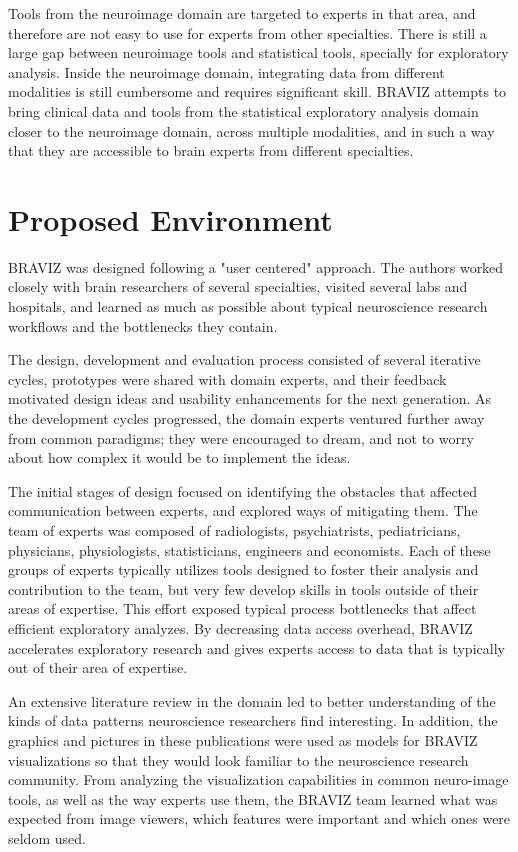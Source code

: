 \documentclass[utf8,paper]{frontiersSCNS} %
\begin{document}
Tools from the neuroimage domain are targeted to experts in that area, and therefore are not easy to use for experts from other specialties. There is still a large gap between neuroimage tools and statistical tools, specially for exploratory analysis. Inside the neuroimage domain, integrating data from different modalities is still cumbersome and requires significant skill. BRAVIZ attempts to bring clinical data and tools from the statistical exploratory analysis domain closer to the neuroimage domain, across multiple modalities, and in such a way that they are accessible to brain experts from different specialties. 

\section{Proposed Environment}

BRAVIZ was designed following a "user centered" approach\citep{fernandez_user-centered_2013,wassink_applying_2009}. The authors worked closely with brain researchers of several specialties, visited several labs and hospitals, and learned as much as possible about typical neuroscience research workflows and the bottlenecks they contain. 

The design, development and evaluation process consisted of several iterative cycles, prototypes were shared with domain experts, and their feedback motivated design ideas and usability enhancements for the next generation. As the development cycles progressed, the domain experts ventured further away from common paradigms; they were encouraged to dream, and not to worry about how complex it would be to implement the ideas. 

The initial stages of design focused on identifying the obstacles that affected communication between experts, and explored ways of mitigating them. The team of experts was composed of radiologists, psychiatrists, pediatricians, physicians, physiologists, statisticians, engineers and economists. Each of these groups of experts typically utilizes tools designed to foster their analysis and contribution to the team, but very few develop skills in tools outside of their areas of expertise. This effort exposed typical process bottlenecks that affect efficient exploratory analyzes. By decreasing data access overhead, BRAVIZ accelerates exploratory research and gives experts access to data that is typically out of their area of expertise.

An extensive literature review in the domain led to better understanding of the kinds of data patterns neuroscience researchers find interesting. In addition, the graphics and pictures in these publications were used as models for BRAVIZ visualizations so that they would look familiar to the neuroscience research community. From analyzing the visualization capabilities in common neuro-image tools, as well as the way experts use them, the BRAVIZ team learned what was expected from image viewers, which features were important and which ones were seldom used. 
\end{document}
